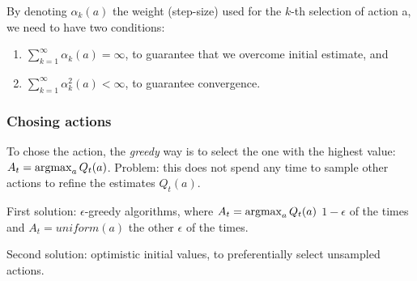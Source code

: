 By denoting $\alpha_k(a)$ the weight (step-size) used for the $k$-th selection of action a, we need to have two conditions:
\begin{enumerate}
\item $\sum_{k=1}^{\infty} \alpha_k(a) = \infty$, to guarantee that we overcome initial estimate, and
\item $\sum_{k=1}^{\infty} \alpha_k^2(a) < \infty$, to guarantee convergence.
\end{enumerate}



\subsubsection{Chosing actions}
To chose the action, the \textit{greedy} way is to select the one with the highest value: $A_t = \operatorname*{argmax}_a Q_t(a)$.
Problem: this does not spend any time to sample other actions to refine the estimates $Q_t(a)$.

First solution: $\epsilon$-greedy algorithms, where $A_t = \operatorname*{argmax}_a Q_t(a)$ $1 - \epsilon$ of the times and $A_t = uniform(a)$ the other $\epsilon$ of the times.

Second solution: optimistic initial values, to preferentially select unsampled actions.



